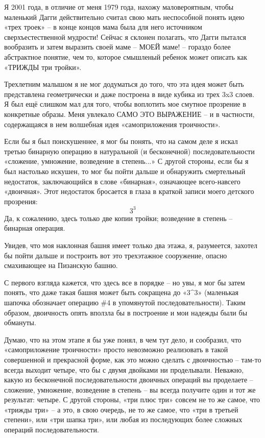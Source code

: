 \documentclass[../main.tex]{subfiles}
\begin{document}
Я 2001 года, в отличие от меня 1979 года, нахожу маловероятным, чтобы маленький Дагги действительно считал свою мать неспособной понять идею «трех троек» \--- в конце концов мама была для него источником сверхъестественной мудрости! Сейчас я склонен полагать, что Дагги пытался вообразить и затем выразить своей маме \--- МОЕЙ маме! \--- гораздо более абстрактное понятие, чем то, которое смышленый ребенок может описать как «ТРИЖДЫ три тройки».

Трехлетним малышом я не мог додуматься до того, что эта идея может быть представлена геометрически и даже построена в виде кубика из трех 3x3 слоев. Я был ещё слишком мал для того, чтобы воплотить мое смутное прозрение в конкретные образы. Меня увлекало САМО ЭТО ВЫРАЖЕНИЕ \--- и в частности, содержащаяся в нем волшебная идея «самоприложения троичности».

Если бы я был поискушеннее, я мог бы понять, что на самом деле я искал третью бинарную операцию в натуральной (и бесконечной) последовательности «сложение, умножение, возведение в степень...» С другой стороны, если бы я был настолько искушен, то мог бы пойти дальше и обнаружить смертельный недостаток, заключающийся в слове «бинарная», означающее всего-навсего «двоичная». Этот недостаток бросается в глаза в краткой записи моего детского прозрения:
\[
    3^3
\]
Да, к сожалению, здесь только две копии тройки; возведение в степень \--- бинарная операция.

Увидев, что моя наклонная башня имеет только два этажа, я, разумеется, захотел бы пойти дальше и построить вот это трехэтажное сооружение, опасно смахивающее на Пизанскую башню.

С первого взгляда кажется, что здесь все в порядке \--- но увы, я мог бы затем понять, что даже такая башня может быть сокращена до «$3 \text{\textasciicircum} 3$» (маленькая шапочка обозначает операцию \#4 в упомянутой последовательности). Таким образом, двоичность опять вползла бы в построение и мои надежды были бы обмануты.

Думаю, что на этом этапе я бы уже понял, в чем тут дело, и сообразил, что «самоприложение троичности» просто невозможно реализовать в такой совершенной и прекрасной форме, как это можно сделать с двоичностью \--- там-то всегда выходит четыре, что бы с двумя двойками ни проделывали. Неважно, какую из бесконечной последовательности двоичных операций вы проделаете \--- сложение, умножение, возведение в степень \--- вы всегда получите один и тот же результат: четыре. С другой стороны, «три плюс три» совсем не то же самое, что «трижды три» \--- а это, в свою очередь, не то же самое, что «три в третьей степени», или «три шапка три», или любая из последующих более сложных операций последовательности.
\end{document}
